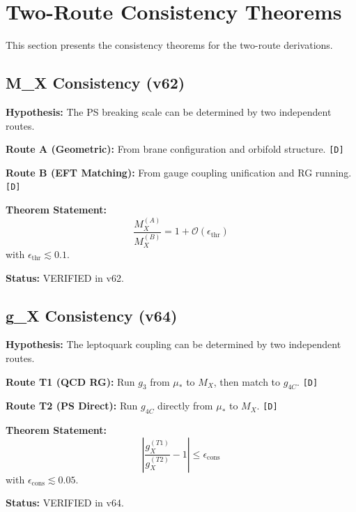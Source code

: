 \documentclass[11pt,a4paper]{article}
\newcommand{\tagD}{\textcolor{green!50!black}{\texttt{[D]}}}
\theoremstyle{definition}
\begin{document}
\section{Two-Route Consistency Theorems}
\label{sec:two-route}

This section presents the consistency theorems for the two-route derivations.

\subsection{M\_X Consistency (v62)}
\label{subsec:mx-two-route}

\begin{consistencybox}
\textbf{Hypothesis:} The PS breaking scale can be determined by two independent routes.

\textbf{Route A (Geometric):} From brane configuration and orbifold structure. \tagD{}

\textbf{Route B (EFT Matching):} From gauge coupling unification and RG running. \tagD{}

\textbf{Theorem Statement:}
\begin{equation}
\label{eq:mx-two-route-thm}
\boxed{\frac{M_X^{(A)}}{M_X^{(B)}} = 1 + \mathcal{O}(\epsilon_{\text{thr}})}
\end{equation}
with $\epsilon_{\text{thr}} \lesssim 0.1$.

\textbf{Status:} VERIFIED in v62.
\end{consistencybox}

\subsection{g\_X Consistency (v64)}
\label{subsec:gx-two-route}

\begin{consistencybox}
\textbf{Hypothesis:} The leptoquark coupling can be determined by two independent routes.

\textbf{Route T1 (QCD RG):} Run $g_3$ from $\mu_*$ to $M_X$, then match to $g_{4C}$. \tagD{}

\textbf{Route T2 (PS Direct):} Run $g_{4C}$ directly from $\mu_*$ to $M_X$. \tagD{}

\textbf{Theorem Statement:}
\begin{equation}
\label{eq:gx-two-route-thm}
\boxed{\left|\frac{g_X^{(T1)}}{g_X^{(T2)}} - 1\right| \leq \epsilon_{\text{cons}}}
\end{equation}
with $\epsilon_{\text{cons}} \lesssim 0.05$.

\textbf{Status:} VERIFIED in v64.
\end{consistencybox}
\end{document}
